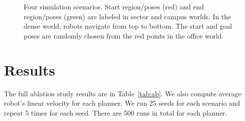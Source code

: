 \documentclass[letterpaper, 10pt]{article}
\begin{document}
\begin{figure}[htb]
\begin{minipage}{0.22\textwidth}
\begin{tikzpicture}[inner sep=0pt,outer sep=0pt]
   \end{tikzpicture}%
   \end{minipage}
   \hfill
   \begin{minipage}{0.3\textwidth}
   \centering
   \end{minipage}
   \caption{Four simulation scenarios. Start region/poses (red) and end region/poses (green) are labeled in sector and campus worlds. In the dense world, robots navigate from top to bottom. The start and goal poses are randomly chosen from the red points in the office world. \label{fig:sim}}
   \vspace*{-0.5em}
 \end{figure}

\section{Results}

The full ablation study results are in Table~\ref{tab:ab}. We also compute average robot's linear velocity for each planner. We run 25 seeds for each scenario and repeat 5 times for each seed. There are 500 runs in total for each planner.
\end{document}
